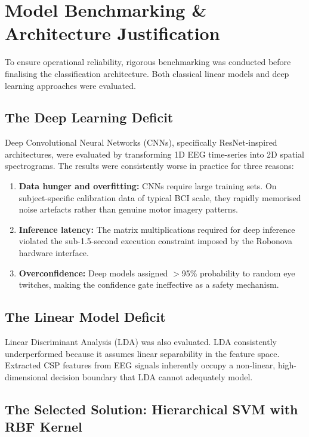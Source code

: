 \documentclass[12pt, a4paper, oneside]{report}
\begin{document}
\section{Model Benchmarking \& Architecture Justification}

To ensure operational reliability, rigorous benchmarking was conducted before finalising
the classification architecture. Both classical linear models and deep learning approaches
were evaluated.

\subsection{The Deep Learning Deficit}

Deep Convolutional Neural Networks (CNNs), specifically ResNet-inspired architectures,
were evaluated by transforming 1D EEG time-series into 2D spatial spectrograms.
The results were consistently worse in practice for three reasons:

\begin{enumerate}
    \item \textbf{Data hunger and overfitting:} CNNs require large training sets.
    On subject-specific calibration data of typical BCI scale, they rapidly memorised
    noise artefacts rather than genuine motor imagery patterns.

    \item \textbf{Inference latency:} The matrix multiplications required for deep
    inference violated the sub-1.5-second execution constraint imposed by the
    Robonova hardware interface.

    \item \textbf{Overconfidence:} Deep models assigned $>$95\% probability to
    random eye twitches, making the confidence gate ineffective as a safety mechanism.
\end{enumerate}

\subsection{The Linear Model Deficit}

Linear Discriminant Analysis (LDA) was also evaluated. LDA consistently underperformed
because it assumes linear separability in the feature space. Extracted CSP features
from EEG signals inherently occupy a non-linear, high-dimensional decision boundary
that LDA cannot adequately model.

\subsection{The Selected Solution: Hierarchical SVM with RBF Kernel}
\end{document}
